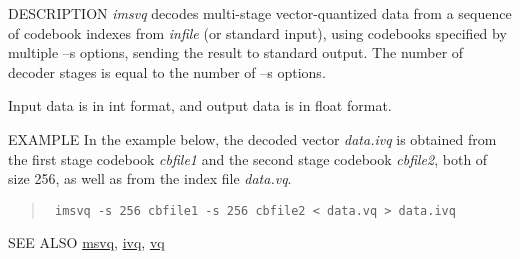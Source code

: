\begin{synopsis}
\item [imsvq] [ --l $L$ ] [ --n $N$ ] [ --s $S \;$ {\em cbfile} ] [ {\em infile} ]
\end{synopsis}

\begin{qsection}{DESCRIPTION}
{\em imsvq} decodes multi-stage vector-quantized data 
from a sequence of codebook indexes from {\em infile} (or standard input), 
using codebooks specified by multiple --s options, 
sending the result to standard output. 
The number of decoder stages is equal to the number of --s options.

Input data is in int format, and output data is in float format.
\end{qsection}

\begin{options}
\end{options}

\begin{qsection}{EXAMPLE}
In the example below,
the decoded vector {\em data.ivq} is obtained
from the first stage codebook {\em cbfile1}
and the second stage codebook {\em cbfile2},
both of size 256, as well as from the index file {\em data.vq}.
\begin{quote}
\verb! imsvq -s 256 cbfile1 -s 256 cbfile2 < data.vq > data.ivq!
\end{quote}
\end{qsection}

\begin{qsection}{SEE ALSO}
\hyperlink{msvq}{msvq},
\hyperlink{ivq}{ivq},
\hyperlink{vq}{vq}
\end{qsection}
